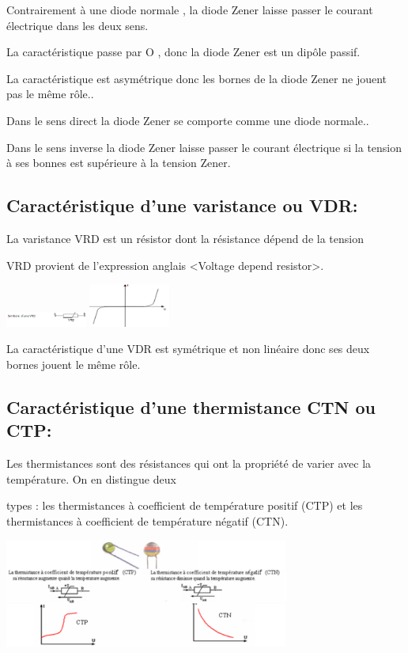 \documentclass[12pt]{article}
\begin{document}
Contrairement à une diode normale , la diode Zener laisse passer le courant électrique dans les deux sens.



\begin{tcolorbox}
La caractéristique passe par O , donc la diode Zener est un dipôle passif.

  La caractéristique est asymétrique donc les bornes de la diode Zener ne jouent pas le même rôle..

  Dans le sens direct la diode Zener se comporte comme une diode normale..

  Dans le sens inverse la diode Zener laisse passer le courant électrique si la tension à ses bonnes est supérieure à
la tension Zener.
\end{tcolorbox}

\subsection{Caractéristique d'une varistance ou VDR:}
La varistance VRD est un résistor  dont la résistance dépend de la tension 

VRD provient de l'expression anglais <Voltage depend resistor>.



\begin{center}
\includegraphics[width=0.2\textwidth]{./img/VDR.png}
\includegraphics[width=0.2\textwidth]{./img/VDR_carca.png}

\end{center}
La caractéristique d'une VDR est symétrique et non linéaire donc ses deux bornes jouent le même rôle.


\subsection {Caractéristique d'une thermistance CTN ou CTP: }
Les thermistances sont des résistances qui ont la propriété de varier avec la température. On en distingue deux

types : les thermistances à coefficient de température positif (CTP) et les thermistances à coefficient de
température négatif (CTN).
\begin{center}
\includegraphics[width=0.7\textwidth]{./img/CTN_CTP.png}

\end{center}
\end{document}

